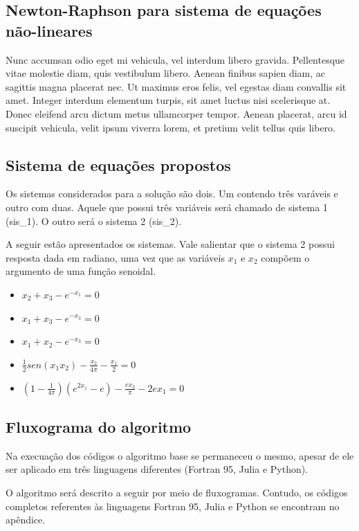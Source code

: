 \documentclass[a4paper, 12pt, openright, oneside]{article}
\begin{document}
\subsection{Newton-Raphson para sistema de equações não-lineares}
Nunc accumsan odio eget mi vehicula, vel interdum libero gravida. Pellentesque vitae molestie diam, quis vestibulum libero. Aenean finibus sapien diam, ac sagittis magna placerat nec. Ut maximus eros felis, vel egestas diam convallis sit amet. Integer interdum elementum turpis, sit amet luctus nisi scelerisque at. Donec eleifend arcu dictum metus ullamcorper tempor. Aenean placerat, arcu id suscipit vehicula, velit ipsum viverra lorem, et pretium velit tellus quis libero.

\subsection{Sistema de equações propostos}

Os sistemas considerados para a solução são dois. Um contendo três varáveis e outro com duas. Aquele que possui três variáveis será chamado de sistema 1 (sis\_1). O outro será o sistema 2 (sis\_2).

A seguir estão apresentados os sistemas. Vale salientar que o sistema 2 possui resposta dada em radiano, uma vez que as variáveis $x_1$ e $x_2$ compõem o argumento de uma função senoidal.


\begin{itemize}
\item $ x_2 + x_3 - e^{-x_1} = 0$
\item $ x_1 + x_3 - e^{-x_3} = 0$
\item $ x_1 + x_2 - e^{-x_3} = 0$
\end{itemize}
\bigskip 
\begin{itemize}
\item $ \frac{1}{2}sen(x_1x_2) - \frac{x_2}{4\pi} - \frac{x_1}{2}  = 0$
\item $ (1-\frac{1}{4\pi})(e^{2x_1}-e) - \frac{ex_2}{\pi} - 2ex_1 = 0$
\end{itemize}


\subsection{Fluxograma do algoritmo}
Na execuação dos códigos o algoritmo base se permaneceu o mesmo, apesar de ele ser aplicado em três linguagens diferentes (Fortran 95, Julia e Python).

O algoritmo será descrito a seguir por meio de fluxogramas. Contudo, os códigos completos referentes às linguagens Fortran 95, Julia e Python se encontram no apêndice. 
\end{document}
